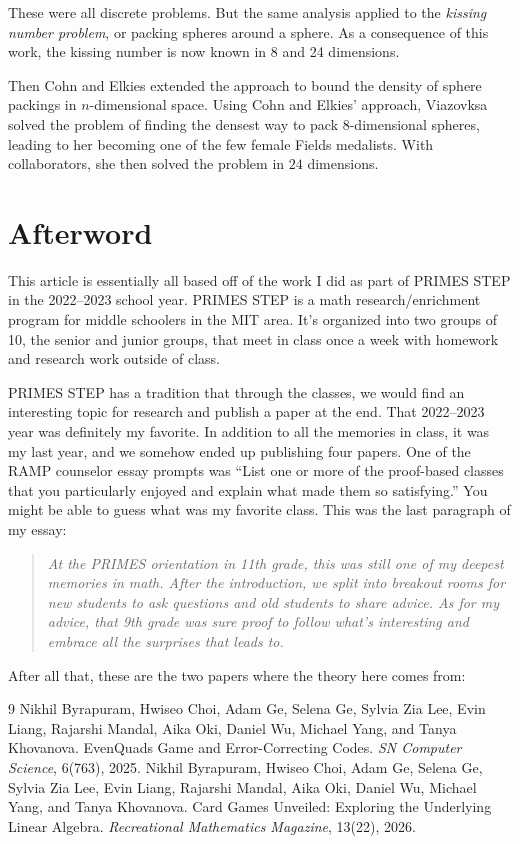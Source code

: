 \documentclass{article}
\theoremstyle{definition}
\theoremstyle{remark}
\begin{document}
These were all discrete problems. But the same analysis applied to the \emph{kissing number problem}, or packing spheres around a sphere. As a consequence of this work, the kissing number is now known in 8 and 24 dimensions.

Then Cohn and Elkies extended the approach to bound the density of sphere packings in $n$-dimensional space. Using Cohn and Elkies' approach, Viazovksa solved the problem of finding the densest way to pack $8$-dimensional spheres, leading to her becoming one of the few female Fields medalists. With collaborators, she then solved the problem in $24$ dimensions.

\section{Afterword}
This article is essentially all based off of the work I did as part of PRIMES STEP in the 2022--2023 school year. PRIMES STEP is a math research/enrichment program for middle schoolers in the MIT area. It's organized into two groups of 10, the senior and junior groups, that meet in class once a week with homework and research work outside of class.

PRIMES STEP has a tradition that through the classes, we would find an interesting topic for research and publish a paper at the end. That 2022--2023 year was definitely my favorite. In addition to all the memories in class, it was my last year, and we somehow ended up publishing four papers. One of the RAMP counselor essay prompts was ``List one or more of the proof-based classes that you particularly enjoyed and explain what made them so satisfying.'' You might be able to guess what was my favorite class. This was the last paragraph of my essay:

\begin{quote}
    \itshape At the PRIMES orientation in 11th grade, this was still one of my deepest memories in math. After the introduction, we split into breakout rooms for new students to ask questions and old students to share advice. As for my advice, that 9th grade was sure proof to follow what's interesting and embrace all the surprises that leads to.
\end{quote}

After all that, these are the two papers where the theory here comes from:

\begingroup
\renewcommand{\section}[2]{}
\begin{thebibliography}{9}
     Nikhil Byrapuram, Hwiseo Choi, Adam Ge, Selena Ge, Sylvia Zia Lee, Evin Liang, Rajarshi Mandal, Aika Oki, Daniel Wu, Michael Yang, and Tanya Khovanova. EvenQuads Game and Error-Correcting Codes. \textit{SN Computer Science}, 6(763), 2025.
     Nikhil Byrapuram, Hwiseo Choi, Adam Ge, Selena Ge, Sylvia Zia Lee, Evin Liang, Rajarshi Mandal, Aika Oki, Daniel Wu, Michael Yang, and Tanya Khovanova. Card Games Unveiled: Exploring the Underlying Linear Algebra. \textit{Recreational Mathematics Magazine}, 13(22), 2026.
\end{thebibliography}
\endgroup
\end{document}
